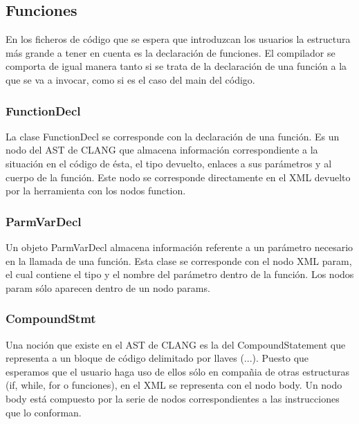 \subsection{Funciones}

En los ficheros de c\'odigo que se espera que introduzcan los usuarios la estructura m\'as grande a tener en cuenta es la declaraci\'on de funciones. El compilador se comporta de igual manera tanto si se trata de la declaraci\'on de una funci\'on a la que se va a invocar, como si es el caso del main del c\'odigo.

\subsubsection*{FunctionDecl}

La clase FunctionDecl se corresponde con la declaraci\'on de una funci\'on. Es un nodo del AST de CLANG que almacena informaci\'on correspondiente a la situaci\'on en el c\'odigo de \'esta, el tipo devuelto, enlaces a sus par\'ametros y al cuerpo de la funci\'on. Este nodo se corresponde directamente en el XML devuelto por la herramienta con los nodos function.

\subsubsection*{ParmVarDecl}

Un objeto ParmVarDecl almacena informaci\'on referente a un par\'ametro necesario en la llamada de una funci\'on. Esta clase se corresponde con el nodo XML param, el cual contiene el tipo y el nombre del par\'ametro dentro de la funci\'on. Los nodos param s\'olo aparecen dentro de un nodo params.

\subsubsection*{CompoundStmt}

Una noci\'on que existe en el AST de CLANG es la del CompoundStatement que representa a un bloque de c\'odigo delimitado por llaves ({...}). Puesto que esperamos que el usuario haga uso de ellos s\'olo en compa\~nia de otras estructuras (if, while, for o funciones), en el XML se representa con el nodo body. Un nodo body est\'a compuesto por la serie de nodos correspondientes a las instrucciones que lo conforman.

